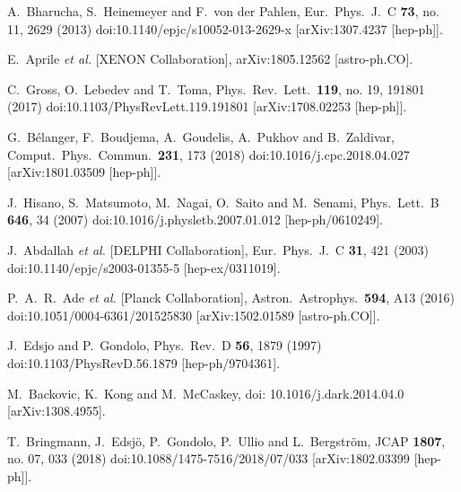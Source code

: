 \documentclass[nofootinbib,prd,aps,superscriptaddress,preprintnumbers]{revtex4}
\begin{document}
\begin{thebibliography}{99}
  A.~Bharucha, S.~Heinemeyer and F.~von der Pahlen,
  Eur.\ Phys.\ J.\ C {\bf 73}, no. 11, 2629 (2013)
  doi:10.1140/epjc/s10052-013-2629-x
  [arXiv:1307.4237 [hep-ph]].

  E.~Aprile {\it et al.} [XENON Collaboration],
  arXiv:1805.12562 [astro-ph.CO].

  C.~Gross, O.~Lebedev and T.~Toma,
  Phys.\ Rev.\ Lett.\  {\bf 119}, no. 19, 191801 (2017)
  doi:10.1103/PhysRevLett.119.191801
  [arXiv:1708.02253 [hep-ph]].

  G.~B\'elanger, F.~Boudjema, A.~Goudelis, A.~Pukhov and B.~Zaldivar,
  Comput.\ Phys.\ Commun.\  {\bf 231}, 173 (2018)
  doi:10.1016/j.cpc.2018.04.027
  [arXiv:1801.03509 [hep-ph]].

  J.~Hisano, S.~Matsumoto, M.~Nagai, O.~Saito and M.~Senami,
  Phys.\ Lett.\ B {\bf 646}, 34 (2007)
  doi:10.1016/j.physletb.2007.01.012
  [hep-ph/0610249].

  J.~Abdallah {\it et al.} [DELPHI Collaboration],
  Eur.\ Phys.\ J.\ C {\bf 31}, 421 (2003)
  doi:10.1140/epjc/s2003-01355-5
  [hep-ex/0311019].

  P.~A.~R.~Ade {\it et al.} [Planck Collaboration],
  Astron.\ Astrophys.\  {\bf 594}, A13 (2016)
  doi:10.1051/0004-6361/201525830
  [arXiv:1502.01589 [astro-ph.CO]].

  J.~Edsjo and P.~Gondolo,
  Phys.\ Rev.\ D {\bf 56}, 1879 (1997)
  doi:10.1103/PhysRevD.56.1879
  [hep-ph/9704361].

  M.~Backovic, K.~Kong and M.~McCaskey,
  doi: 10.1016/j.dark.2014.04.0
  [arXiv:1308.4955].

  T.~Bringmann, J.~Edsj\"o, P.~Gondolo, P.~Ullio and L.~Bergstr\"om,
  JCAP {\bf 1807}, no. 07, 033 (2018)
  doi:10.1088/1475-7516/2018/07/033
  [arXiv:1802.03399 [hep-ph]].


\end{thebibliography}
\end{document}
